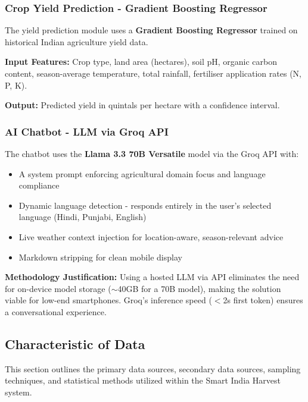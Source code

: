 \documentclass[12pt,a4paper]{article}
\begin{document}
\subsubsection{Crop Yield Prediction - Gradient Boosting Regressor}
The yield prediction module uses a \textbf{Gradient Boosting Regressor} trained on historical Indian agriculture yield data.

\textbf{Input Features:} Crop type, land area (hectares), soil pH, organic carbon content, season-average temperature, total rainfall, fertiliser application rates (N, P, K).

\textbf{Output:} Predicted yield in quintals per hectare with a confidence interval.

\subsubsection{AI Chatbot - LLM via Groq API}
The chatbot uses the \textbf{Llama 3.3 70B Versatile} model via the Groq API with:
\begin{itemize}
    \item A system prompt enforcing agricultural domain focus and language compliance
    \item Dynamic language detection - responds entirely in the user's selected language (Hindi, Punjabi, English)
    \item Live weather context injection for location-aware, season-relevant advice
    \item Markdown stripping for clean mobile display
\end{itemize}

\textbf{Methodology Justification:} Using a hosted LLM via API eliminates the need for on-device model storage ($\sim$40GB for a 70B model), making the solution viable for low-end smartphones. Groq's inference speed ($<$2s first token) ensures a conversational experience.

\subsection{Characteristic of Data}

This section outlines the primary data sources, secondary data sources, sampling techniques, and statistical methods utilized within the Smart India Harvest system.
\end{document}
